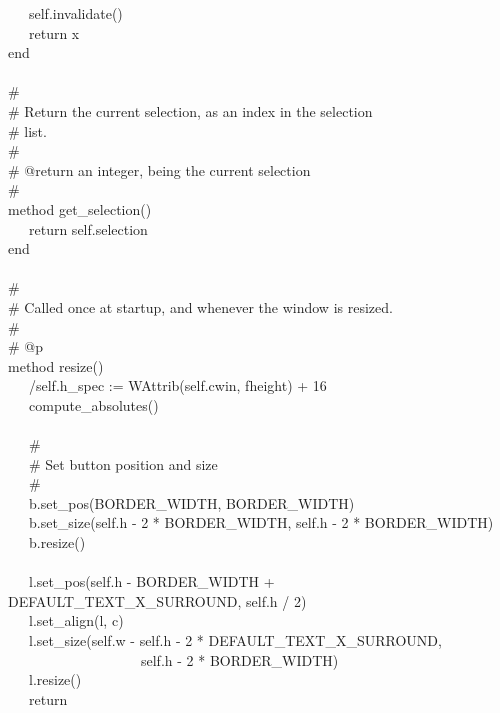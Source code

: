 {\>   \ \ \ self.invalidate() \\
\>   \ \ \ return x \\
\>   end \\
\ \\
\>   \# \\
\>   \# Return the current selection, as an index in the selection \\
\>   \# list. \\
\>   \# \\
\>   \# @return an integer, being the current selection \\
\>   \# \\
\>   method get\_selection() \\
\>   \ \ \ return self.selection \\
\>   end \\
\ \\
\>   \# \\
\>   \# Called once at startup, and whenever the window is resized. \\
\>   \# \\
\>   \# @p \\
\>   method resize() \\
\>   \ \ \ /self.h\_spec := WAttrib(self.cwin,
{\textquotedbl}fheight{\textquotedbl}) + 16 \\
\>   \ \ \ compute\_absolutes() \\
\ \\
\>   \ \ \ \# \\
\>   \ \ \ \# Set button position and size \\
\>   \ \ \ \# \\
\>   \ \ \ b.set\_pos(BORDER\_WIDTH, BORDER\_WIDTH) \\
\>   \ \ \ b.set\_size(self.h - 2 * BORDER\_WIDTH, self.h - 2 *
BORDER\_WIDTH) \\
\>   \ \ \ b.resize() \\
\ \\
\>   \ \ \ l.set\_pos(self.h - BORDER\_WIDTH +
DEFAULT\_TEXT\_X\_SURROUND, self.h / 2) \\
\>   \ \ \ l.set\_align({\textquotedbl}l{\textquotedbl},
{\textquotedbl}c{\textquotedbl}) \\
\>   \ \ \ l.set\_size(self.w - self.h - 2 *
DEFAULT\_TEXT\_X\_SURROUND, \\
\>   \ \ \ \ \ \ \ \ \ \ \ \ \ \ \ \ \ \ \ self.h - 2 * BORDER\_WIDTH) \\
\>   \ \ \ l.resize() \\
\>   \ \ \ return \\
}
